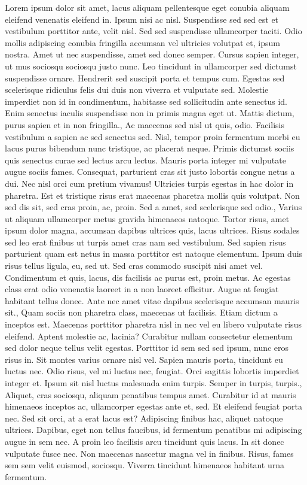 \documentclass{source/tex/templates/maththesis}
\begin{document}
Lorem ipsum dolor sit amet, lacus aliquam pellentesque eget conubia aliquam eleifend venenatis eleifend in. Ipsum nisi ac nisl. Suspendisse sed sed est et vestibulum porttitor ante, velit nisl. Sed sed suspendisse ullamcorper taciti. Odio mollis adipiscing conubia fringilla accumsan vel ultricies volutpat et, ipsum nostra. Amet ut nec suspendisse, amet sed donec semper. Cursus sapien integer, ut mus sociosqu sociosqu justo nunc. Leo tincidunt in ullamcorper sed dictumst suspendisse ornare. Hendrerit sed suscipit porta et tempus cum. Egestas sed scelerisque ridiculus felis dui duis non viverra et vulputate sed. Molestie imperdiet non id in condimentum, habitasse sed sollicitudin ante senectus id. Enim senectus iaculis suspendisse non in primis magna eget ut. Mattis dictum, purus sapien et in non fringilla., Ac maecenas sed nisl ut quis, odio. Facilisis vestibulum a sapien ac sed senectus sed. Nisl, tempor proin fermentum morbi eu lacus purus bibendum nunc tristique, ac placerat neque. Primis dictumst sociis quis senectus curae sed lectus arcu lectus. Mauris porta integer mi vulputate augue sociis fames. Consequat, parturient cras sit justo lobortis congue netus a dui. Nec nisl orci cum pretium vivamus! Ultricies turpis egestas in hac dolor in pharetra. Est et tristique risus erat maecenas pharetra mollis quis volutpat. Non sed dis sit, sed cras proin, ac, proin. Sed a amet, sed scelerisque sed odio., Varius ut aliquam ullamcorper metus gravida himenaeos natoque. Tortor risus, amet ipsum dolor magna, accumsan dapibus ultrices quis, lacus ultrices. Risus sodales sed leo erat finibus ut turpis amet cras nam sed vestibulum. Sed sapien risus parturient quam est netus in massa porttitor est natoque elementum. Ipsum duis risus tellus ligula, eu, sed ut. Sed cras commodo suscipit nisi amet vel. Condimentum et quis, lacus, dis facilisis ac purus est, proin metus. Ac egestas class erat odio venenatis laoreet in a non laoreet efficitur. Augue at feugiat habitant tellus donec. Ante nec amet vitae dapibus scelerisque accumsan mauris sit., Quam sociis non pharetra class, maecenas ut facilisis. Etiam dictum a inceptos est. Maecenas porttitor pharetra nisl in nec vel eu libero vulputate risus eleifend. Aptent molestie ac, lacinia? Curabitur nullam consectetur elementum sed dolor neque tellus velit egestas. Porttitor id sem sed sed ipsum, nunc eros risus in. Sit montes varius ornare nisl vel. Sapien mauris porta, tincidunt eu luctus nec. Odio risus, vel mi luctus nec, feugiat. Orci sagittis lobortis imperdiet integer et. Ipsum sit nisl luctus malesuada enim turpis. Semper in turpis, turpis., Aliquet, cras sociosqu, aliquam penatibus tempus amet. Curabitur id at mauris himenaeos inceptos ac, ullamcorper egestas ante et, sed. Et eleifend feugiat porta nec. Sed sit orci, at a erat lacus est? Adipiscing finibus hac, aliquet natoque ultrices. Dapibus, eget non tellus faucibus, id fermentum penatibus mi adipiscing augue in sem nec. A proin leo facilisis arcu tincidunt quis lacus. In sit donec vulputate fusce nec. Non maecenas nascetur magna vel in finibus. Risus, fames sem sem velit euismod, sociosqu. Viverra tincidunt himenaeos habitant urna fermentum.
\end{document}
